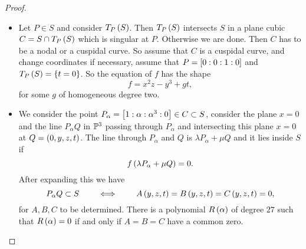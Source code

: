 \begin{proof}
\hfill
\begin{itemize}
\item Let $ P \in S $ and consider $ T_P\rb{S} $. Then $ T_P\rb{S} $ intersects $ S $ in a plane cubic $ C = S \cap T_P\rb{S} $ which is singular at $ P $. Otherwise we are done. Then $ C $ has to be a nodal or a cuspidal curve. So assume that $ C $ is a cuspidal curve, and change coordinates if necessary, assume that $ P = \sb{0 : 0 : 1 : 0} $ and $ T_P\rb{S} = \cb{t = 0} $. So the equation of $ f $ has the shape
$$ f = x^2z - y^3 + gt, $$
for some $ g $ of homogeneous degree two.
\item We consider the point $ P_\alpha = \sb{1 : \alpha : \alpha^3 : 0} \in C \subset S $, consider the plane $ x = 0 $ and the line $ P_\alpha Q $ in $ \P^3 $ passing through $ P_\alpha $ and intersecting this plane $ x = 0 $ at $ Q = \rb{0, y, z, t} $. The line through $ P_\alpha $ and $ Q $ is $ \lambda P_\alpha + \mu Q $ and it lies inside $ S $ if
$$ f\rb{\lambda P_\alpha + \mu Q} = 0. $$
After expanding this we have
$$ P_\alpha Q \subset S \qquad \iff \qquad A\rb{y, z, t} = B\rb{y, z, t} = C\rb{y, z, t} = 0, $$
for $ A, B, C $ to be determined. There is a polynomial $ R\rb{\alpha} $ of degree $ 27 $ such that $ R\rb{\alpha} = 0 $ if and only if $ A = B = C $ have a common zero.

\pagebreak



\end{itemize}
\end{proof}
